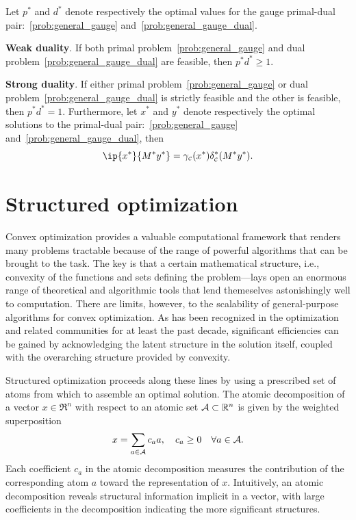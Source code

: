 \begin{theorem} 
    Let $p^*$ and $d^*$ denote respectively the optimal values for the gauge primal-dual pair:~\eqref{prob:general_gauge} and~\eqref{prob:general_gauge_dual}. 
    \item \textbf{Weak duality}. If both primal problem~\eqref{prob:general_gauge} and dual problem~\eqref{prob:general_gauge_dual} are feasible, then $p^* d^* \geq 1$. 
    \item \textbf{Strong duality}. If either primal problem~\eqref{prob:general_gauge} or dual problem~\eqref{prob:general_gauge_dual} is strictly feasible and the other is feasible, then $p^* d^* = 1$. Furthermore, let $x^*$ and $y^*$ denote respectively the optimal solutions to the primal-dual pair:~\eqref{prob:general_gauge} and~\eqref{prob:general_gauge_dual}, then 
    \[\ip{x^*}{M^*y^*} = \gauge\Cs(x^*)\delta\Cs^*(M^*y^*).\]
    
\end{theorem}

\section{Structured optimization} \label{sec:1-3}

Convex optimization provides a valuable computational framework that renders many problems tractable because of the range of powerful algorithms that can be brought to the task. The key is that a certain mathematical structure, i.e., convexity of the functions and sets defining the problem—lays open an enormous range of theoretical and algorithmic tools that lend themeselves astonishingly well to computation. There are limits, however, to the scalability of general-purpose algorithms for convex optimization. As has been recognized in the optimization and related communities for at least the past decade, significant efficiencies can be gained by acknowledging the latent structure in the solution itself, coupled with the overarching structure provided by convexity.

Structured optimization proceeds along these lines by using a prescribed set of atoms from which to assemble an optimal solution. The atomic decomposition of a vector $x\in\Re^n$ with respect to an atomic set
$\mathcal{A}\subset\mathbb{R}^n$ is given by the weighted superposition
\begin{equation} \label{eq:atomic-decomp}
  x = \sum_{a\in\mathcal{A}} c_a a, \quad c_a\ge0 \quad \forall a\in\mathcal{A}.
\end{equation}
Each coefficient $c_a$ in the atomic decomposition measures the contribution of
the corresponding atom $a$ toward the representation of $x$. Intuitively, an
atomic decomposition reveals structural information implicit in a vector, with
large coefficients in the decomposition indicating the more significant
structures.

